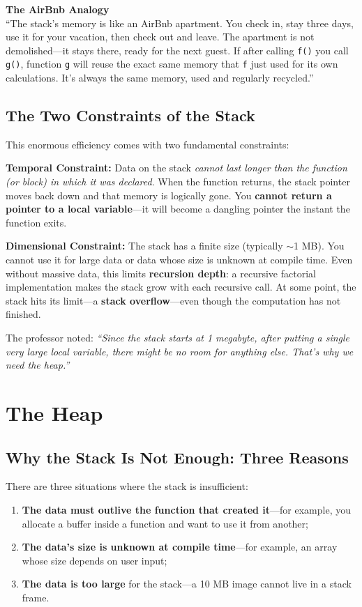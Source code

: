 \begin{insightbox}
\textbf{The AirBnb Analogy} \\
``The stack's memory is like an AirBnb apartment. You check in, stay three days, use it for your vacation, then check out and leave. The apartment is not demolished---it stays there, ready for the next guest. If after calling \texttt{f()} you call \texttt{g()}, function \texttt{g} will reuse the exact same memory that \texttt{f} just used for its own calculations. It's always the same memory, used and regularly recycled.''
\end{insightbox}

\subsection{The Two Constraints of the Stack}

This enormous efficiency comes with two fundamental constraints:

\textbf{Temporal Constraint:} Data on the stack \emph{cannot last longer than the function (or block) in which it was declared}. When the function returns, the stack pointer moves back down and that memory is logically gone. You \textbf{cannot return a pointer to a local variable}---it will become a dangling pointer the instant the function exits.

\textbf{Dimensional Constraint:} The stack has a finite size (typically $\sim$1 MB). You cannot use it for large data or data whose size is unknown at compile time. Even without massive data, this limits \textbf{recursion depth}: a recursive factorial implementation makes the stack grow with each recursive call. At some point, the stack hits its limit---a \textbf{stack overflow}---even though the computation has not finished.

The professor noted: \emph{``Since the stack starts at 1 megabyte, after putting a single very large local variable, there might be no room for anything else. That's why we need the heap.''}

\section{The Heap}

\subsection{Why the Stack Is Not Enough: Three Reasons}

There are three situations where the stack is insufficient:
\begin{enumerate}
    \item \textbf{The data must outlive the function that created it}---for example, you allocate a buffer inside a function and want to use it from another;
    \item \textbf{The data's size is unknown at compile time}---for example, an array whose size depends on user input;
    \item \textbf{The data is too large} for the stack---a 10 MB image cannot live in a stack frame.
\end{enumerate}

